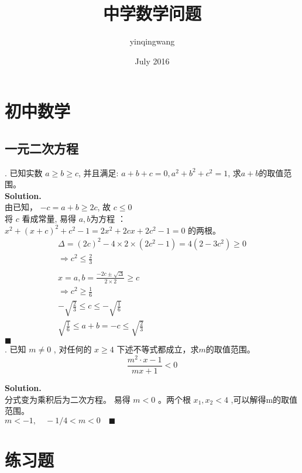 \documentclass[UTF8]{article}
\title{中学数学问题}
\author{yinqingwang }
\date{July 2016}
\begin{document}
	\maketitle
	\tableofcontents
\newpage

\section{初中数学}
\subsection{一元二次方程}

. 已知实数 $a \ge b \ge c$, 并且满足: $a+b+c=0, a^2+b^2+c^2=1$, 求$a+b$的取值范围。 \\
\noindent \textbf{Solution.} \\
由已知， $ -c = a + b \ge 2c$, 故 $  c \le 0 $ \\
将 $c$ 看成常量, 易得 $a,b$为方程 ： $x^2 + (x+c)^2 + c^2 -1 = 2x^2 + 2cx + 2c^2 -1 =0$ 的两根。
\begin{align*}
\Delta = (2c)^2 - 4\times 2 \times (2c^2-1) = 4(2-3c^2)\ge 0 \\
\Rightarrow  c^2 \le \frac{2}{3} \\
\\
x =a,b = \frac{-2c \pm \sqrt{\Delta }}{2\times 2} \ge c \\
\Rightarrow c^2 \ge \frac{1}{6} \\
-\sqrt{\frac{2}{3}} \le c \le -\sqrt{\frac{1}{6}} \\
\sqrt{\frac{1}{6}} \le a+b=-c \le \sqrt{\frac{2}{3}}
\end{align*}
$\blacksquare$ \\

. 已知 $ m \ne 0$ , 对任何的 $x\ge4$ 下述不等式都成立，求$m$的取值范围。 
$$ \frac{m^2\cdot x -1}{mx+1} < 0 $$

\noindent \textbf{Solution.} \\
分式变为乘积后为二次方程。 易得 $m<0$ 。两个根 $x_1,x_2 <4$ ,可以解得m的取值范围。\\
$m<-1 , \quad -1/4<m<0 \quad \blacksquare$

\section{练习题}
\end{document}
